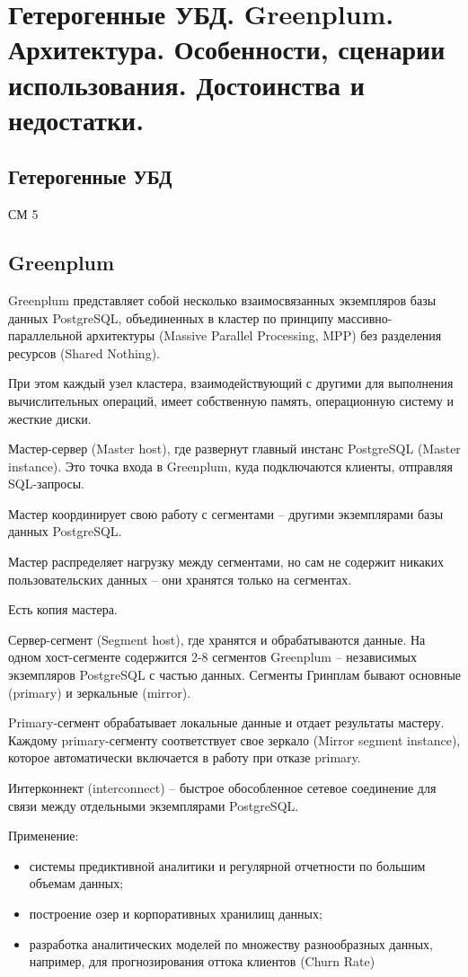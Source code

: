 \section{Гетерогенные УБД. Greenplum. Архитектура. Особенности, сценарии использования. Достоинства и недостатки.}

\subsection*{Гетерогенные УБД}

СМ 5

\subsection*{Greenplum}


Greenplum представляет собой несколько взаимосвязанных
экземпляров базы данных PostgreSQL, объединенных в кластер
по принципу массивно-параллельной архитектуры (Massive
Parallel Processing, MPP) без разделения ресурсов (Shared
Nothing).

При этом каждый узел кластера, взаимодействующий с
другими для выполнения вычислительных операций, имеет
собственную память, операционную систему и жесткие диски.

Мастер-сервер (Master host), где развернут главный инстанс
PostgreSQL (Master instance). Это точка входа в Greenplum, куда
подключаются клиенты, отправляя SQL-запросы.

Мастер координирует свою работу с сегментами – другими
экземплярами базы данных PostgreSQL.

Мастер распределяет нагрузку между сегментами, но сам не
содержит никаких пользовательских данных – они хранятся
только на сегментах.

Есть копия мастера.

Сервер-сегмент (Segment host), где хранятся и
обрабатываются данные. На одном хост-сегменте содержится 2-8
сегментов Greenplum – независимых экземпляров PostgreSQL с
частью данных. Сегменты Гринплам бывают основные (primary) и
зеркальные (mirror).

Primary-сегмент обрабатывает локальные данные и отдает
результаты мастеру. Каждому primary-сегменту соответствует свое
зеркало (Mirror segment instance), которое автоматически
включается в работу при отказе primary.

Интерконнект (interconnect) – быстрое обособленное сетевое
соединение для связи между отдельными экземплярами
PostgreSQL.

Применение:
\begin{itemize}
    \item системы предиктивной аналитики и регулярной отчетности по
    большим объемам данных;
    \item построение озер и корпоративных хранилищ данных;
    \item разработка аналитических моделей по множеству
    разнообразных данных, например, для прогнозирования оттока
    клиентов (Churn Rate)
\end{itemize}

